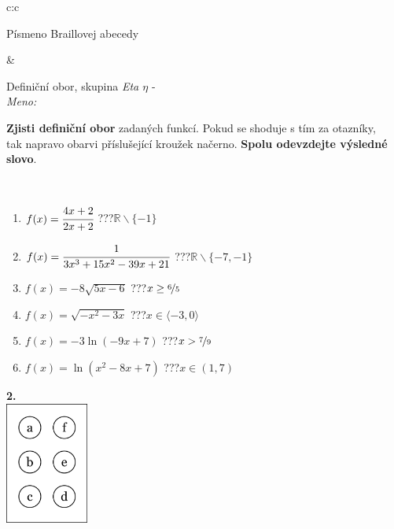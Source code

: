 \documentclass[10pt]{report}
\begin{document}
\begin{tabular}{c:c}
\begin{minipage}[c][104.5mm][t]{0.5\linewidth}
\begin{center}
\begin{minipage}{0.20\linewidth}
\begin{center}
{\small Písmeno Braillovej abecedy}
\end{center}
\end{minipage}
\end{center}
\end{minipage}
&
\begin{minipage}[c][104.5mm][t]{0.5\linewidth}
\begin{center}
\vspace{7mm}
{\huge Definiční obor, skupina \textit{Eta $\eta$} -}\\[5mm]
\textit{Meno:}\phantom{xxxxxxxxxxxxxxxxxxxxxxxxxxxxxxxxxxxxxxxxxxxxxxxxxxxxxxxxxxxxxxxxx}\\[5mm]
\begin{minipage}{0.95\linewidth}
\textbf{Zjisti definiční obor} zadaných funkcí. Pokud se shoduje s tím za otazníky,\\tak napravo obarvi příslušející kroužek načerno. \textbf{Spolu odevzdejte výsledné slovo}.
\end{minipage}
\\[1mm]
\begin{minipage}{0.79\linewidth}
\begin{center}
\begin{varwidth}{\linewidth}
\begin{enumerate}
\normalsizerrr
\item $f(x)=\cfrac{4x+2}{2x+2}$\quad \dotfill\; ???\;\dotfill \quad $\mathbb{R}\smallsetminus\{-1\}$
\item $f(x)=\cfrac{1}{3x^3+15x^2-39x+21}$\quad \dotfill\; ???\;\dotfill \quad $\mathbb{R}\smallsetminus\{-7,-1\}$
\item $f(x)=-8\sqrt{5x-6}$\quad \dotfill\; ???\;\dotfill \quad $x\geq\nicefrac{6}{5}$
\item $f(x)=\sqrt{-x^2-3x}$\quad \dotfill\; ???\;\dotfill \quad $x\in\langle-3 , 0\rangle$
\item $f(x)=-3\ln{(-9x+7)}$\quad \dotfill\; ???\;\dotfill \quad $x>\nicefrac{7}{9}$
\item $f(x)=\ln{(x^2-8x+7)}$\quad \dotfill\; ???\;\dotfill \quad $x\in(1 , 7)$
\end{enumerate}
\end{varwidth}
\end{center}
\end{minipage}
\begin{minipage}{0.20\linewidth}
\begin{center}
{\Huge\bfseries 2.} \\[2mm]
\includegraphics[height=40mm]{../images/braille.png}

\end{center}
\end{minipage}
\end{center}
\end{minipage}
\end{tabular}
\end{document}
